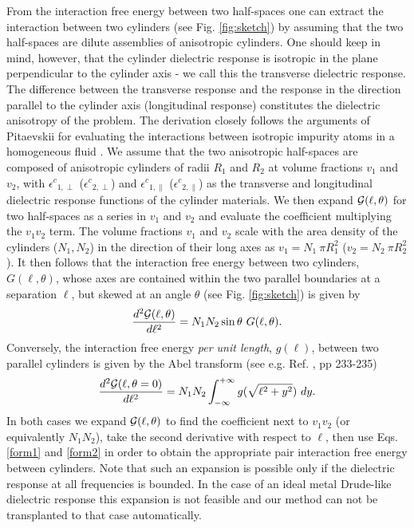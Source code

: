 \documentclass[onecolumn,letterpaper,amsmath,amssymb,floatfix,aps,superscriptaddress]{revtex4}
\begin{document}
From the interaction free energy between two half-spaces one can extract the interaction between two cylinders (see Fig. \ref{fig:sketch}) by assuming that the two half-spaces are 
dilute assemblies of anisotropic cylinders. One should keep in mind, however, that the cylinder dielectric response is isotropic in the plane perpendicular 
to the cylinder axis - we call this the transverse dielectric response. The difference between the transverse response and the response in the direction parallel 
to the cylinder axis (longitudinal response) constitutes the dielectric anisotropy of the problem. The derivation closely follows the arguments of Pitaevskii 
for evaluating the interactions between isotropic impurity 
atoms in a homogeneous fluid \cite{Pitaevskii}. 
We assume that the two anisotropic half-spaces are composed of anisotropic cylinders of radii $R_1$ and $R_2$ at volume fractions $v_1$ and $v_2$, with 
${\epsilon^{c}}_{1,\perp}$ (${\epsilon^{c}}_{2,\perp}$) and ${\epsilon^{c}}_{1,\parallel}$ (${\epsilon^{c}}_{2,\parallel}$) as the 
transverse and longitudinal dielectric response functions of the cylinder materials. We then expand ${\cal G}(\ell,\theta)$ for two half-spaces 
as a series in $v_1$ and $v_2$ and evaluate the coefficient multiplying the $v_1 v_2$ term. The volume 
fractions $v_1$ and $v_2$ scale with the area density of the cylinders ($N_1, N_2$) in the direction of their long axes as $v_1 = N_1~\pi R_1^{2}$ ($v_2 = N_2~\pi R_2^{2}$). It then follows \cite{Parsegian} that the interaction free energy between two cylinders, $G(\ell,\theta)$, whose axes are contained within the two parallel boundaries 
at a separation $\ell$, but skewed at an angle $\theta$ (see Fig. \ref{fig:sketch}) is given by 
\begin{equation}
\frac{d^{2}{\cal G}(\ell,\theta)}{d\ell^{2}}= N_1 N_2\sin{\theta}~G(\ell,\theta).
\label{form1}
\end{equation}
Conversely, the interaction free energy {\sl per unit length}, $g(\ell)$, between two parallel cylinders is given by the Abel transform (see e.g. Ref. , pp 233-235)
\begin{equation}
\frac{d^{2}{\cal G}(\ell,\theta=0)}{d\ell^{2}}=N_1 N_2\int_{-\infty}^{+\infty}g(\sqrt{\ell^{2}+y^{2}})~dy.
\label{form2}
\end{equation}
In both cases we expand ${\cal G}(\ell,\theta)$ to find the coefficient next to $v_1 v_2$ (or equivalently $N_1 N_2$), take the second derivative with respect to $\ell$, then use Eqs. \ref{form1} and \ref{form2} in order to obtain the appropriate pair interaction free energy between cylinders. Note that such an expansion is possible only if the dielectric response at all frequencies is bounded. In the case of an ideal metal Drude-like dielectric response this expansion is not feasible and our method can not be transplanted to that case automatically.
\end{document}
